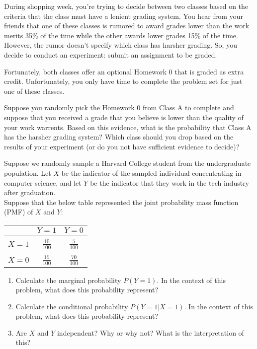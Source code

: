 \documentclass{harvardml}
\theoremstyle{definition}
\theoremstyle{plain}
\begin{document}
\begin{problem}
During shopping week, you're trying to decide between two classes based on the
criteria that the class must have a lenient grading system. You hear from your
friends that one of these classes is rumored to award grades lower than the work
merits 35\% of the time while the other awards lower grades 15\% of the time.
However, the rumor doesn't specify which class has harsher grading. So, you
decide to conduct an experiment: submit an assignment to be graded. 

Fortunately, both classes offer an optional Homework 0 that is graded as extra
credit. Unfortunately, you only have time to complete the problem set for just
one of these classes. 

Suppose you randomly pick the Homework 0 from Class A to complete and suppose
that you received a grade that you believe is lower than the quality of your
work warrents. Based on this evidence, what is the probability that Class A has
the harsher grading system? Which class should you drop based on the results of
your experiment (or do you not have sufficient evidence to decide)?
\end{problem}


\begin{problem}
Suppose we randomly sample a Harvard College student from the undergraduate
population.  Let $X$ be the indicator of the sampled individual concentrating in
computer science, and let $Y$ be the indicator that they work in the tech
industry after graduation.\\

Suppose that the below table represented the joint probability mass function
(PMF) of $X$ and $Y$:

\begin{center}
\begin{tabular}{ c | c c }
  & $Y = 1$ & $Y = 0$ \\ \hline\\
 $X = 1$ & $\frac{10}{100}$ & $\frac{5}{100}$ \\  \\
 $X = 0$ & $\frac{15}{100}$ & $\frac{70}{100}$ \\   
\end{tabular}
\end{center}


\begin{enumerate} [label=(\alph*)] 
\item Calculate the marginal probability $P(Y = 1)$.  In the context of this problem, what does this probability represent?
\item Calculate the conditional probability $P(Y = 1 | X = 1)$.  In the context of this problem, what does this probability represent?
\item Are $X$ and $Y$ independent?  Why or why not? What is the interpretation of this?

\end{enumerate}
\end{problem}
\end{document}
